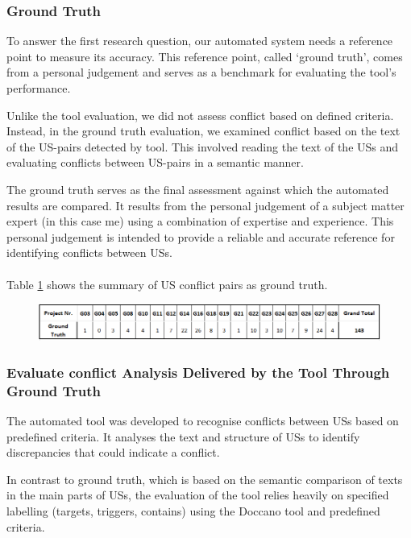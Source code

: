 \subsubsection*{Ground Truth}
To answer the first research question, our automated system needs a reference point to measure its accuracy. This reference point, called ‘ground truth’, comes from a personal judgement and serves as a benchmark for evaluating the tool's performance.

Unlike the tool evaluation, we did not assess conflict based on defined criteria. Instead, in the ground truth evaluation, we examined conflict based on the text of the US-pairs detected by tool. This involved reading the text of the USs and evaluating conflicts between US-pairs in a semantic manner.

The ground truth serves as the final assessment against which the automated results are compared. It results from the personal judgement of a subject matter expert (in this case me) using a combination of expertise and experience. This personal judgement is intended to provide a reliable and accurate reference for identifying conflicts between USs.\\\\
Table \ref{tb:conflict_ground_truth} shows the summary of US conflict pairs as ground truth.
\begin{figure}[h]
	\begingroup
	\scriptsize
	\centering
	\includegraphics[scale=0.6]{Table/conflict_ground_truth.png}
	\label{tb:conflict_ground_truth}	
	\endgroup
\end{figure}
\subsubsection*{Evaluate conflict Analysis Delivered by the Tool Through Ground Truth}
The automated tool was developed to recognise conflicts between USs based on predefined criteria. It analyses the text and structure of USs to identify discrepancies that could indicate a conflict.

In contrast to ground truth, which is based on the semantic comparison of texts in the main parts of USs, the evaluation of the tool relies heavily on specified labelling (targets, triggers, contains) using the Doccano tool and predefined criteria.


